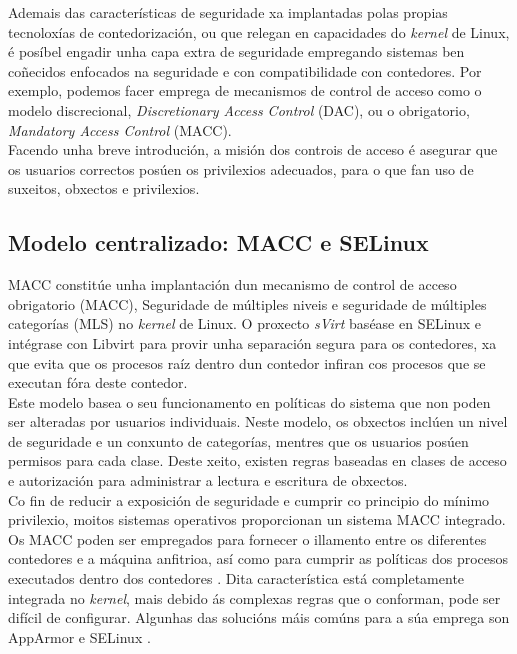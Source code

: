 Ademais das características de seguridade xa implantadas polas propias tecnoloxías de contedorización, ou que relegan en capacidades do \textit{kernel} de Linux, é posíbel engadir unha capa extra de seguridade empregando sistemas ben coñecidos enfocados na seguridade e con compatibilidade con contedores. Por exemplo, podemos facer emprega de mecanismos de control de acceso como o modelo discrecional, \textit{Discretionary Access Control} (DAC), ou o obrigatorio, \textit{Mandatory Access Control} (\gls{MACC}).\\

Facendo unha breve introdución, a misión dos controis de acceso é asegurar que os usuarios correctos posúen os privilexios adecuados, para o que fan uso de suxeitos, obxectos e privilexios.

\subsection{Modelo centralizado: \gls{MACC} e \gls{SELinux}}

\gls{MACC} constitúe unha implantación dun mecanismo de control de acceso obrigatorio (\gls{MACC}), Seguridade de múltiples niveis e seguridade de múltiples categorías (MLS) no \textit{kernel} de Linux. O proxecto \textit{sVirt} baséase en \gls{SELinux} e intégrase con Libvirt para provir unha separación segura para os contedores, xa que evita que os procesos raíz dentro dun contedor infiran cos procesos que se executan fóra deste contedor. \cite{Securing-Docker-Containers-from-Denial-of-Service}\\

Este modelo basea o seu funcionamento en políticas do sistema que non poden ser alteradas por usuarios individuais. Neste modelo, os obxectos inclúen un nivel de seguridade e un conxunto de categorías, mentres que os usuarios posúen permisos para cada clase. Deste xeito, existen regras baseadas en clases de acceso e autorización para administrar a lectura e escritura de obxectos. \\

Co fin de reducir a exposición de seguridade e cumprir co principio do mínimo privilexio, moitos sistemas operativos proporcionan un sistema \gls{MACC} integrado. Os \gls{MACC} poden ser empregados para fornecer o illamento entre os diferentes contedores e a máquina anfitrioa, así como para cumprir as políticas dos procesos executados dentro dos contedores \cite{OS-level-security}. Dita característica está completamente integrada no \textit{kernel}, mais debido ás complexas regras que o conforman, pode ser difícil de configurar. Algunhas das solucións máis comúns para a súa emprega son AppArmor e \gls{SELinux} \cite{TFM}.\\

